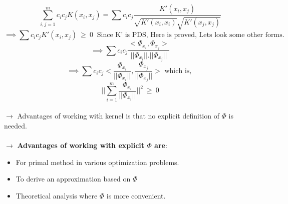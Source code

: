 \documentclass{article}
\begin{document}
    $$\sum_{i,j=1}^{m}c_ic_jK(x_i,x_j)=\sum c_ic_j\frac{K'(x_i,x_j)}{\sqrt{K'(x_i,x_i)}\sqrt{K'(x_j,x_j)}}$$
    $$\implies\sum c_ic_jK'(x_i,x_j)~\geq~0~\text{ Since K' is PDS, Here is proved, Lets look some other forms.}$$
    $$\implies\sum c_ic_j\frac{<\Phi_{x_i},\Phi_{x_j}>}{||\Phi_{x_i}||.||\Phi_{x_j}||}$$
    $$\implies\sum c_ic_j<\frac{\Phi_{x_i}}{||\Phi_{x_i}||},\frac{\Phi_{x_j}}{||\Phi_{x_j}||}> \text{ which is, }$$
    $$||\sum_{i=1}^{m}\frac{\Phi_{x_i}}{||\Phi_{x_i}||}||^2~\geq~0$$
    \\
    $\rightarrow$ Advantages of working with kernel is that no explicit definition of $\Phi$ is needed.\\\\
    $\rightarrow$ \textbf{Advantages of working with explicit $\Phi$ are}:
    \begin{itemize}
    	\item For primal method in various optimization problems.
    	\item To derive an approximation based on $\Phi$
    	\item Theoretical analysis where $\Phi$ is more convenient.
    \end{itemize}
\end{document}
